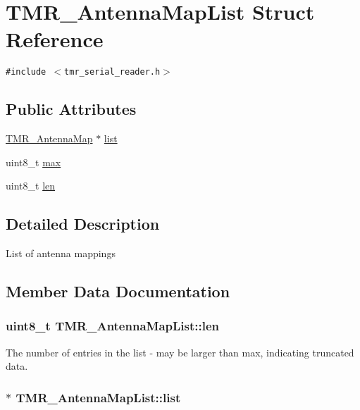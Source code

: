 \hypertarget{struct_t_m_r___antenna_map_list}{
\section{TMR\_\-AntennaMapList Struct Reference}
\label{struct_t_m_r___antenna_map_list}
}
{\tt \#include $<$tmr\_\-serial\_\-reader.h$>$}

\subsection*{Public Attributes}
\begin{CompactItemize}
\item 
\hyperlink{struct_t_m_r___antenna_map}{TMR\_\-AntennaMap} $\ast$ \hyperlink{struct_t_m_r___antenna_map_list_31dc71172135903a4ae7eed62ce0fa6d}{list}
\item 
uint8\_\-t \hyperlink{struct_t_m_r___antenna_map_list_a10791133a0a5b4db6e175ce31d1cbef}{max}
\item 
uint8\_\-t \hyperlink{struct_t_m_r___antenna_map_list_0e94e790e405b3e8228787d9f2b9a9c7}{len}
\end{CompactItemize}


\subsection{Detailed Description}
List of antenna mappings 

\subsection{Member Data Documentation}
\hypertarget{struct_t_m_r___antenna_map_list_0e94e790e405b3e8228787d9f2b9a9c7}{
\subsubsection[{len}]{\setlength{\rightskip}{0pt plus 5cm}uint8\_\-t {\bf TMR\_\-AntennaMapList::len}}}
\label{struct_t_m_r___antenna_map_list_0e94e790e405b3e8228787d9f2b9a9c7}


The number of entries in the list - may be larger than max, indicating truncated data. \hypertarget{struct_t_m_r___antenna_map_list_31dc71172135903a4ae7eed62ce0fa6d}{
\subsubsection[{list}]{$\ast$ {\bf TMR\_\-AntennaMapList::list}}}
\label{struct_t_m_r___antenna_map_list_31dc71172135903a4ae7eed62ce0fa6d}


